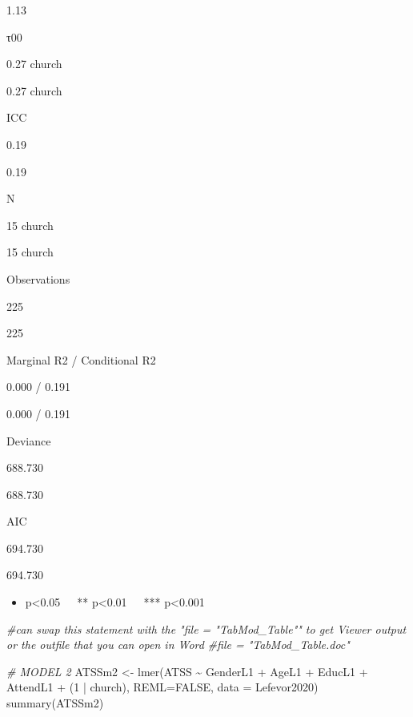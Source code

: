 \documentclass[
  11pt,
]{book}
\newenvironment{Shaded}{\begin{snugshade}}{\end{snugshade}}
\newcommand{\AttributeTok}[1]{\textcolor[rgb]{0.77,0.63,0.00}{#1}}
\newcommand{\CommentTok}[1]{\textcolor[rgb]{0.56,0.35,0.01}{\textit{#1}}}
\newcommand{\ConstantTok}[1]{\textcolor[rgb]{0.00,0.00,0.00}{#1}}
\newcommand{\DecValTok}[1]{\textcolor[rgb]{0.00,0.00,0.81}{#1}}
\newcommand{\FunctionTok}[1]{\textcolor[rgb]{0.00,0.00,0.00}{#1}}
\newcommand{\NormalTok}[1]{#1}
\newcommand{\OtherTok}[1]{\textcolor[rgb]{0.56,0.35,0.01}{#1}}
\newcommand{\SpecialCharTok}[1]{\textcolor[rgb]{0.00,0.00,0.00}{#1}}
\providecommand{\tightlist}{%
  \setlength{\itemsep}{0pt}\setlength{\parskip}{0pt}}
\begin{document}
1.13

τ00

0.27 church

0.27 church

ICC

0.19

0.19

N

15 church

15 church

Observations

225

225

Marginal R2 / Conditional R2

0.000 / 0.191

0.000 / 0.191

Deviance

688.730

688.730

AIC

694.730

694.730

\begin{itemize}
\tightlist
\item
  p\textless0.05~~~** p\textless0.01~~~*** p\textless0.001
\end{itemize}

\begin{Shaded}
\begin{Highlighting}[]
\CommentTok{\#can swap this statement with the "file = "TabMod\_Table"" to get Viewer output or the outfile that you can open in Word}
\CommentTok{\#file = "TabMod\_Table.doc"}
\end{Highlighting}
\end{Shaded}

\begin{Shaded}
\begin{Highlighting}[]
\CommentTok{\# MODEL 2}
\NormalTok{ATSSm2 }\OtherTok{\textless{}{-}} \FunctionTok{lmer}\NormalTok{(ATSS }\SpecialCharTok{\textasciitilde{}}\NormalTok{ GenderL1 }\SpecialCharTok{+}\NormalTok{ AgeL1 }\SpecialCharTok{+}\NormalTok{ EducL1 }\SpecialCharTok{+}\NormalTok{ AttendL1 }\SpecialCharTok{+}\NormalTok{ (}\DecValTok{1} \SpecialCharTok{|}\NormalTok{ church), }\AttributeTok{REML=}\ConstantTok{FALSE}\NormalTok{, }\AttributeTok{data =}\NormalTok{ Lefevor2020)}
\FunctionTok{summary}\NormalTok{(ATSSm2)}
\end{Highlighting}
\end{Shaded}
\end{document}
